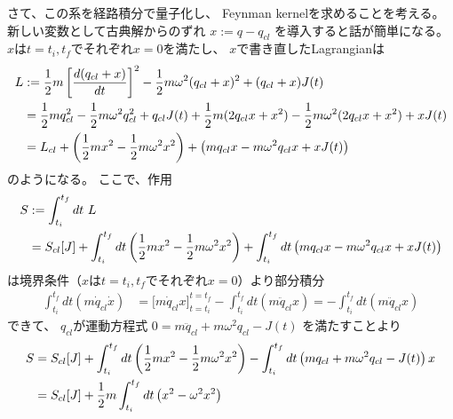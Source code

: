 さて、この系を経路積分で量子化し、
Feynman kernelを求めることを考える。
新しい変数として古典解からのずれ
$x := q - q_{cl}$
を導入すると話が簡単になる。
$x$は$t=t_i, t_f$でそれぞれ$x=0$を満たし、
$x$で書き直したLagrangianは
\begin{align}
    L
    &:=
    \frac{1}{2}m
    \left[
        \frac{d(q_{cl}+x)}{dt}
    \right]^2
    -
    \frac{1}{2}m\omega^2(
        q_{cl} + x
    )^2
    +
    (
        q_{cl} + x
    )
    J(t)
\notag\\&=
    \frac{1}{2}m
    \dot{q}_{cl}^2
    -
    \frac{1}{2}m\omega^2
        q_{cl}^2
    +
        q_{cl}
        J(t)
    +
    \frac{1}{2}m(
        2 \dot{q}_{cl} \dot{x}
        +
        \dot{x}^2
    )
    -
    \frac{1}{2}m\omega^2(
        2q_{cl}x + x^2
    )
    +
    xJ(t)
\notag\\&=
    L_{cl}
    +
    \left(
        \frac{1}{2}m
        \dot{x}^2
        -
        \frac{1}{2}m
        \omega^2x^2
    \right)
    +
    \left(
        m\dot{q}_{cl} \dot{x}
        -
        m\omega^2 q_{cl}
        x + x J(t)
    \right)
\end{align}
のようになる。
ここで、作用
\begin{align}
    S
    &:=
    \int_{t_i}^{t_f}dt\ L
\notag\\&=
    S_{cl} [J]
    +
    \int_{t_i}^{t_f} dt
    \left(
        \frac{1}{2} m \dot{x}^2
        -
        \frac{1}{2} m \omega^2 x^2
    \right)
    +
    \int_{t_i}^{t_f}dt
    \left(
        m \dot{q}_{cl} \dot{x}
        -
        m\omega^2q_{cl} x
        +
        xJ(t)
    \right)
\end{align}
は境界条件（$x$は$t=t_i, t_f$でそれぞれ$x=0$）より部分積分
\begin{align}
    \int_{t_i}^{t_f}dt
    \left(
        m\dot{q}_{cl} \dot{x}
    \right)
&=
    \bigg[
        m \dot{q}_{cl} x
    \bigg]_{t=t_i}^{t=t_f}
    -
    \int_{t_i}^{t_f} dt
    \left(
        m \ddot{q}_{cl} x
    \right)
=
    -
    \int_{t_i}^{t_f} dt
    \left(
        m \ddot{q}_{cl} x
    \right)
\end{align}
できて、
$q_{cl}$が運動方程式
$0 = m \ddot{q}_{cl} + m \omega^2 q_{cl} - J(t)$
を満たすことより
\begin{align}
    S
    &=
    S_{cl} [J]
    +
    \int_{t_i}^{t_f} dt
    \left(
        \frac{1}{2} m \dot{x}^2
        -
        \frac{1}{2} m \omega^2 x^2
    \right)
    -
    \int_{t_i}^{t_f} dt
    \left(
        m \ddot{q}_{cl}
        +
        m \omega^2 q_{cl}
        -
        J(t)
    \right)
    x
\notag\\&=
    S_{cl} [J]
    +
    \frac{1}{2} m
    \int_{t_i}^{t_f} dt
    \left(
        \dot{x}^2
        -
        \omega^2 x^2
    \right)
\end{align}
